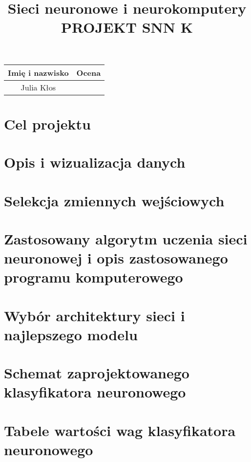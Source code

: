 \documentclass{article}
\title{Sieci neuronowe i neurokomputery\\
\textbf{PROJEKT SNN K}}
\date{}
\begin{document}
\maketitle
\begin{table}[ht]
\vspace{-2cm}
\begin{center}
 \begin{adjustbox}{width=0.4\textwidth}
\begin{tabular}{|c|c|}
\hline
Imię i nazwisko & Ocena \\ \hline
 Julia Kłos      &       \\ [5ex]\hline
\end{tabular}
\end{adjustbox}
\end{center}
\end{table}



\section{Cel projektu}

\section{Opis i wizualizacja danych}

\section{Selekcja zmiennych wejściowych}
\section{Zastosowany algorytm uczenia sieci neuronowej i opis zastosowanego programu komputerowego}
\section{Wybór architektury sieci i najlepszego modelu}
\section{Schemat zaprojektowanego klasyfikatora neuronowego}
\section{Tabele wartości wag klasyfikatora neuronowego}
\end{document}
